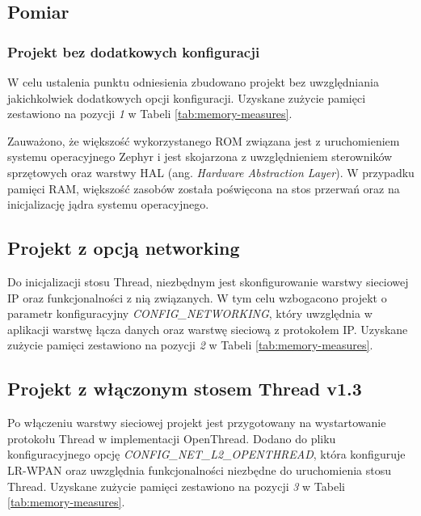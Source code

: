    \subsection{Pomiar}
    \label{subsec:mem-footprint-measure}

        \subsubsection{Projekt bez dodatkowych konfiguracji}
        
        W celu ustalenia punktu odniesienia zbudowano projekt bez uwzględniania jakichkolwiek dodatkowych opcji konfiguracji.
        Uzyskane zużycie pamięci zestawiono na pozycji \textit{1} w Tabeli \ref{tab:memory-measures}.
        
        Zauważono, że większość wykorzystanego ROM związana jest z uruchomieniem systemu operacyjnego Zephyr i jest skojarzona z uwzględnieniem sterowników sprzętowych oraz warstwy HAL (ang. \textit{Hardware Abstraction Layer}). W przypadku pamięci RAM, większość zasobów została poświęcona na stos przerwań oraz na inicjalizację jądra systemu operacyjnego.

        \subsection{Projekt z opcją networking}

        Do inicjalizacji stosu Thread, niezbędnym jest skonfigurowanie warstwy sieciowej IP oraz funkcjonalności z nią związanych. W tym celu wzbogacono projekt o parametr konfiguracyjny \textit{CONFIG\_NETWORKING}, który uwzględnia w aplikacji warstwę łącza danych oraz warstwę sieciową z protokołem IP.
        Uzyskane zużycie pamięci zestawiono na pozycji \textit{2} w Tabeli \ref{tab:memory-measures}.

        \subsection{Projekt z włączonym stosem Thread v1.3}

        Po włączeniu warstwy sieciowej projekt jest przygotowany na wystartowanie protokołu Thread w implementacji OpenThread. Dodano do pliku konfiguracyjnego opcję \textit{CONFIG\_NET\_L2\_OPENTHREAD}, która konfiguruje LR-WPAN oraz uwzględnia funkcjonalności niezbędne do uruchomienia stosu Thread. Uzyskane zużycie pamięci zestawiono na pozycji \textit{3} w Tabeli \ref{tab:memory-measures}.

